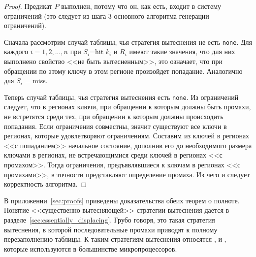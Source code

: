 \begin{theorem}\label{mirror_correctness}
\CorrectnessMirror
\end{theorem}
\begin{proof}
  Предикат $P$ выполнен, потому что он, как есть, входит в систему ограничений (это следует из шага 3 основного алгоритма генерации ограничений).

  Сначала рассмотрим случай таблицы, чья стратегия вытеснения не есть \texttt{none}. Для каждого $i = 1, 2, ..., n$ при $S_i${=}hit  $k_i$ и $R_i$ имеют такие значения, что для них выполнено свойство <<не быть вытесненным>>, это означает, что при обращении по этому ключу в этом регионе произойдет попадание. Аналогично для $S_i$ = miss.

  Теперь случай таблицы, чья стратегия вытеснения есть \texttt{none}. Из ограничений следует, что в регионах ключи, при обращении к которым должны быть промахи, не встретятся среди тех, при обращении к которым должны происходить попадания. Если ограничения совместны, значит существуют все ключи в регионах, которые удовлетворяют ограничениям. Составим из ключей в регионах <<с попаданием>> начальное состояние, дополнив его до необходимого размера ключами в регионах, не встречающимися среди ключей в регионах <<с промахом>>. Тогда ограничения, предъявлявшиеся к ключам в регионах <<с промахами>>, в точности представляют определение промаха. Из чего и следует корректность алгоритма.
\end{proof}

\begin{theorem}\label{mirror_fullness_none}
\FullnessMirrorNone
\end{theorem}

\begin{theorem}\label{mirror_fullness}
\FullnessMirror
\end{theorem}

В приложении~\ref{sec:proofs} приведены доказательства обеих теорем о полноте. Понятие <<существенно вытесняющей>> стратегии вытеснения дается в разделе~\ref{sec:essentially_displacing}. Грубо говоря, это такая стратегия вытеснения, в которой последовательные промахи приводят к полному перезаполнению таблицы. К таким стратегиям вытеснения относятся \LRU, \FIFO и \PseudoLRU, которые используются в большинстве микропроцессоров.

